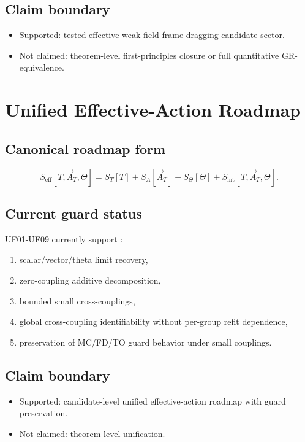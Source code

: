 \documentclass[11pt,a4paper]{article}
\begin{document}
\subsection{Claim boundary}

\begin{itemize}
  \item Supported: tested-effective weak-field frame-dragging candidate sector.
  \item Not claimed: theorem-level first-principles closure or full quantitative GR-equivalence.
\end{itemize}

\section{Unified Effective-Action Roadmap}

\subsection{Canonical roadmap form}

\[
S_{\mathrm{eff}}[T,\vec A_T,\Theta]
=
S_T[T]+S_A[\vec A_T]+S_\Theta[\Theta]+S_{\mathrm{int}}[T,\vec A_T,\Theta].
\]

\subsection{Current guard status}

UF01-UF09 currently support \cite{unified_action_roadmap,trm_status_v3}:
\begin{enumerate}
  \item scalar/vector/theta limit recovery,
  \item zero-coupling additive decomposition,
  \item bounded small cross-couplings,
  \item global cross-coupling identifiability without per-group refit dependence,
  \item preservation of MC/FD/TO guard behavior under small couplings.
\end{enumerate}

\subsection{Claim boundary}

\begin{itemize}
  \item Supported: candidate-level unified effective-action roadmap with guard preservation.
  \item Not claimed: theorem-level unification.
\end{itemize}
\end{document}
